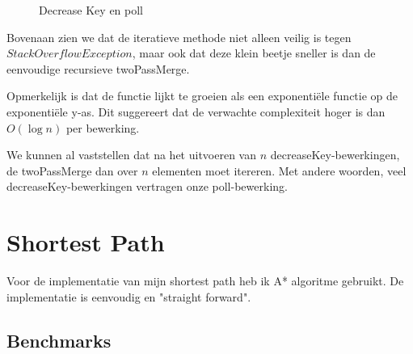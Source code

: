 \documentclass[12pt,a4paper,fleqn]{report}
\begin{document}
\begin{figure}[htbp]
	\centering
	\caption{Decrease Key en poll}
\end{figure}

	Bovenaan zien we dat de iteratieve methode niet alleen veilig is tegen
	$StackOverflowException$, maar ook dat deze klein beetje sneller is dan de eenvoudige
	recursieve \textsf{twoPassMerge}.

	Opmerkelijk is dat de functie lijkt te groeien als een exponentiële functie op de
	exponentiële y-as. Dit suggereert dat de verwachte complexiteit hoger is dan $O(\log n)$
	per bewerking.

	We kunnen al vaststellen dat na het uitvoeren van $n$ \textsf{decreaseKey}-bewerkingen,
	de \textsf{twoPassMerge} dan over $n$ elementen moet itereren. Met andere woorden, veel
	\textsf{decreaseKey}-bewerkingen vertragen onze \textsf{poll}-bewerking.

	\chapter{Shortest Path}

	Voor de implementatie van mijn shortest path heb ik A* algoritme gebruikt.
	De implementatie is eenvoudig en "straight forward".

	\section{Benchmarks}
\end{document}

